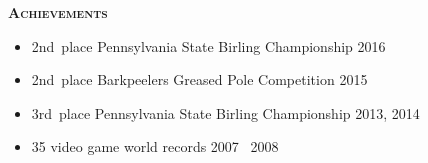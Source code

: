 \documentclass{article}
\newcommand{\mysection}[1]{\vspace{0.5cm}
\hspace{-1.3cm}\textsc{\textbf{#1}}~\hrulefill}
\begin{document}
\mysection{Achievements}

\begin{itemize}
\item 2nd~place Pennsylvania State Birling Championship \hfill 2016
\item 2nd~place Barkpeelers Greased Pole Competition \hfill 2015
\item 3rd~place Pennsylvania State Birling Championship \hfill 2013, 2014
\item 35 video game world records \hfill 2007 \textendash\ 2008
\end{itemize}
\end{document}
